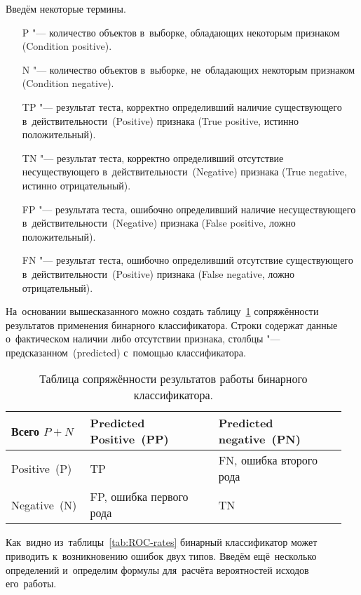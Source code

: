 \documentclass[]{scrreprt}
\begin{document}
Введём некоторые термины.
\begin{itemize}
	\item[P "---] количество объектов в~выборке, обладающих некоторым признаком (\foreignlanguage{english}{Condition positive}).
	\item[N "---] количество объектов в~выборке, не~обладающих некоторым признаком (\foreignlanguage{english}{Condition negative}).
	\item[TP "---] результат теста, корректно определивший наличие существующего в~действительности~(\foreignlanguage{english}{Positive}) признака (\foreignlanguage{english}{True positive}, истинно положительный).
	\item[TN "---] результат теста, корректно определивший отсутствие несуществующего в~действительности~(\foreignlanguage{english}{Negative}) признака (\foreignlanguage{english}{True negative}, истинно отрицательный).
	\item[FP "---] результата теста, ошибочно определивший наличие несуществующего в~действительности~(\foreignlanguage{english}{Negative}) признака (\foreignlanguage{english}{False positive}, ложно положительный).
	\item[FN "---] результат теста, ошибочно определивший отсутствие существующего в~действительности~(\foreignlanguage{english}{Positive}) признака (\foreignlanguage{english}{False negative}, ложно отрицательный).
\end{itemize}
На~основании вышесказанного можно создать таблицу~\ref{tab:ROC-contingency-table} сопряжённости результатов применения бинарного классификатора. Строки содержат данные о~фактическом наличии либо отсутствии признака, столбцы "--- предсказанном~(\foreignlanguage{english}{predicted}) с~помощью классификатора.
%
\begin{table}[ht]
	\caption{Таблица сопряжённости результатов работы бинарного классификатора.}  \label{tab:ROC-contingency-table}
	\centering
	\begin{tabularx}{\textwidth}{p{0.2\linewidth} p{0.375\linewidth} p{0.375\linewidth}} 
		\hline
		Всего $P+N$&Predicted Positive~(PP)&Predicted negative~(PN)\\
		\hline
		Positive~(P)&TP&FN, ошибка второго рода~\cite{Wiki:type-1-2-errors}\\
		\hline
		Negative~(N)&FP, ошибка первого рода~\cite{Wiki:type-1-2-errors}&TN\\
		\hline
	\end{tabularx}
\end{table}
%
Как~видно из~таблицы~\ref{tab:ROC-rates} бинарный классификатор может приводить к~возникновению ошибок двух типов. Введём ещё~несколько определений и~определим формулы для~расчёта вероятностей исходов его~работы.
\end{document}
